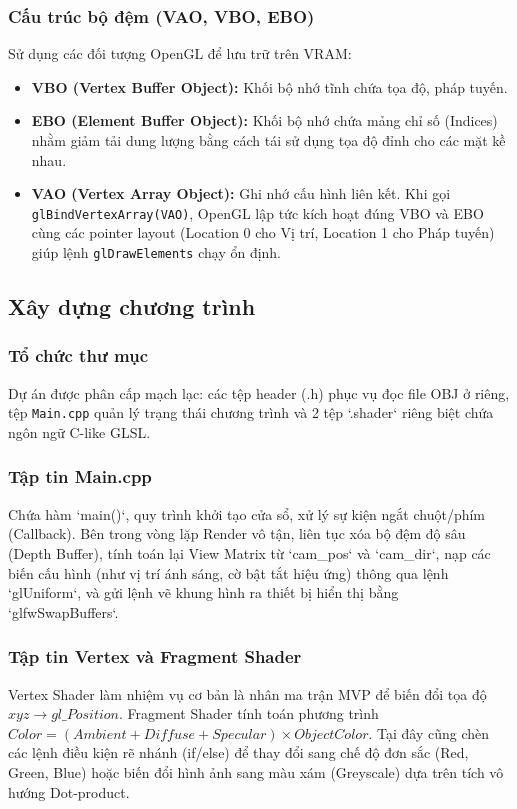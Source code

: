 \documentclass[13pt, a4paper]{extarticle}
\begin{document}
\subsubsection{Cấu trúc bộ đệm (VAO, VBO, EBO)}
Sử dụng các đối tượng OpenGL để lưu trữ trên VRAM:
\begin{itemize}
    \item \textbf{VBO (Vertex Buffer Object):} Khối bộ nhớ tĩnh chứa tọa độ, pháp tuyến.
    \item \textbf{EBO (Element Buffer Object):} Khối bộ nhớ chứa mảng chỉ số (Indices) nhằm giảm tải dung lượng bằng cách tái sử dụng tọa độ đỉnh cho các mặt kề nhau.
    \item \textbf{VAO (Vertex Array Object):} Ghi nhớ cấu hình liên kết. Khi gọi \texttt{glBindVertexArray(VAO)}, OpenGL lập tức kích hoạt đúng VBO và EBO cùng các pointer layout (Location 0 cho Vị trí, Location 1 cho Pháp tuyến) giúp lệnh \texttt{glDrawElements} chạy ổn định.
\end{itemize}

\subsection{Xây dựng chương trình}
\subsubsection{Tổ chức thư mục}
Dự án được phân cấp mạch lạc: các tệp header (.h) phục vụ đọc file OBJ ở riêng, tệp \texttt{Main.cpp} quản lý trạng thái chương trình và 2 tệp `.shader` riêng biệt chứa ngôn ngữ C-like GLSL.

\subsubsection{Tập tin Main.cpp}
Chứa hàm `main()`, quy trình khởi tạo cửa sổ, xử lý sự kiện ngắt chuột/phím (Callback). Bên trong vòng lặp Render vô tận, liên tục xóa bộ đệm độ sâu (Depth Buffer), tính toán lại View Matrix từ `cam\_pos` và `cam\_dir`, nạp các biến cấu hình (như vị trí ánh sáng, cờ bật tắt hiệu ứng) thông qua lệnh `glUniform`, và gửi lệnh vẽ khung hình ra thiết bị hiển thị bằng `glfwSwapBuffers`.

\subsubsection{Tập tin Vertex và Fragment Shader}
Vertex Shader làm nhiệm vụ cơ bản là nhân ma trận MVP để biến đổi tọa độ $xyz \rightarrow gl\_Position$. Fragment Shader tính toán phương trình $Color = (Ambient + Diffuse + Specular) \times ObjectColor$. Tại đây cũng chèn các lệnh điều kiện rẽ nhánh (if/else) để thay đổi sang chế độ đơn sắc (Red, Green, Blue) hoặc biến đổi hình ảnh sang màu xám (Greyscale) dựa trên tích vô hướng Dot-product.
\end{document}
